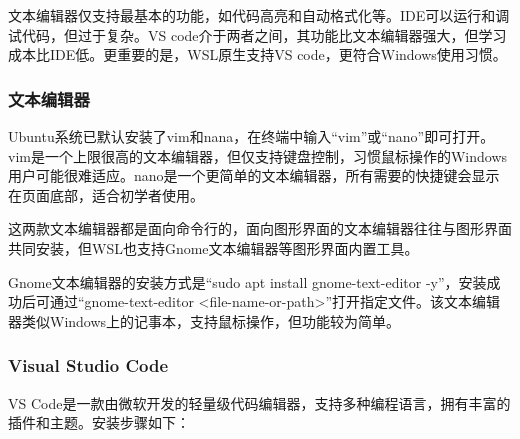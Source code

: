 \documentclass[fontset=ubuntu]{ctexart}
\begin{document}
文本编辑器仅支持最基本的功能，如代码高亮和自动格式化等。IDE可以运行和调试代码，但过于复杂。VS code介于两者之间，其功能比文本编辑器强大，但学习成本比IDE低。更重要的是，WSL原生支持VS code，更符合Windows使用习惯。

\subsubsection{文本编辑器}

Ubuntu系统已默认安装了vim和nana，在终端中输入“vim”或“nano”即可打开。vim是一个上限很高的文本编辑器，但仅支持键盘控制，习惯鼠标操作的Windows用户可能很难适应。nano是一个更简单的文本编辑器，所有需要的快捷键会显示在页面底部，适合初学者使用。

这两款文本编辑器都是面向命令行的，面向图形界面的文本编辑器往往与图形界面共同安装，但WSL也支持Gnome文本编辑器等图形界面内置工具。

Gnome文本编辑器的安装方式是“sudo apt install gnome-text-editor -y”，安装成功后可通过“gnome-text-editor <file-name-or-path>”打开指定文件。该文本编辑器类似Windows上的记事本，支持鼠标操作，但功能较为简单。

\subsubsection{Visual Studio Code}

VS Code是一款由微软开发的轻量级代码编辑器，支持多种编程语言，拥有丰富的插件和主题。安装步骤如下：
\end{document}
